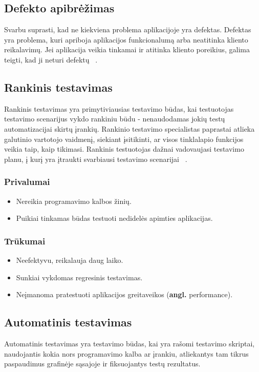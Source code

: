 \documentclass[a4paper,12pt,fleqn]{article}
\begin{document}
\subsection{Defekto apibrėžimas}
Svarbu suprasti, kad ne kiekviena problema aplikacijoje yra defektas. Defektas yra problema, kuri apriboja aplikacijos funkcionalumą arba neatitinka kliento reikalavimų. Jei aplikacija veikia tinkamai ir atitinka kliento poreikius, galima teigti, kad ji neturi defektų ~\cite{article}.

\subsection{Rankinis testavimas}
Rankinis testavimas yra primytiviausias testavimo būdas, kai testuotojas testavimo scenarijus vykdo rankiniu būdu - nenaudodamas jokių testų automatizacijai skirtų įrankių. Rankinio testavimo specialistas paprastai atlieka galutinio vartotojo vaidmenį, siekiant įsitikinti, ar visos tinklalapio funkcijos veikia taip, kaip tikimasi. Rankinis testuotojas dažnai vadovaujasi testavimo planu, į kurį yra įtraukti svarbiausi testavimo scenarijai ~\cite{itkonen2007defect}.

\subsubsection{Privalumai}
\begin{itemize}
    \item Nereikia programavimo kalbos žinių.
    \item Puikiai tinkamas būdas testuoti nedidelės apimties aplikacijas.
\end{itemize}

\subsubsection{Trūkumai}
\begin{itemize}
    \item Neefektyvu, reikalauja daug laiko.
    \item Sunkiai vykdomas regresinis testavimas.
    \item Neįmanoma pratestuoti aplikacijos greitaveikos (\textbf{angl.} performance).
\end{itemize}

\subsection{Automatinis testavimas}
Automatinis testavimas yra testavimo būdas, kai yra rašomi testavimo skriptai, naudojantis kokia nors programavimo kalba ar įrankiu, atliekantys tam tikrus paspaudimus grafinėje sąsajoje ir fiksuojantys testų rezultatus.
\end{document}
